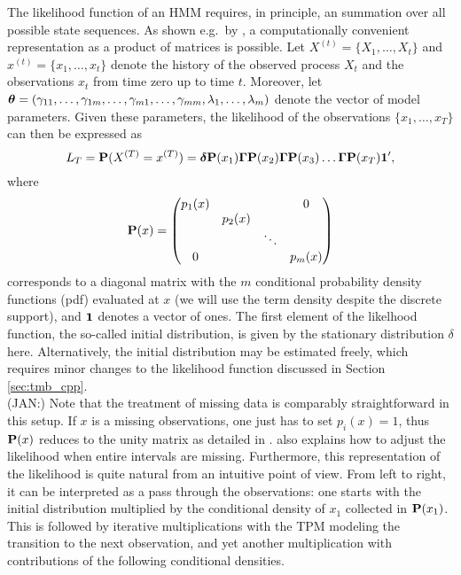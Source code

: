 \documentclass[bimj,fleqn]{w-art}\usepackage[]{graphicx}\usepackage[]{color}
\newcommand{\bcp}{{\bf P}}
\newcommand{\bgamma}{\mbox{\boldmath $\Gamma$}}
\newcommand{\btheta}{\mbox{\boldmath $\theta$}}
\newcommand{\bfdelta}{\mbox{\boldmath $\delta$}}
\newcommand{\bone}{{\bf 1}}
\theoremstyle{plain}
\theoremstyle{definition}
\begin{document}
The likelihood function of an HMM requires, in principle, an summation over all possible state sequences. As shown e.g.~by \citet[p.~37]{zucchini}, a computationally convenient representation as a product of matrices is possible. Let $X^{(t)} = \{X_1, \ldots, X_t \}$ and $x^{(t)} = \{x_1, \ldots, x_t \}$ denote the history of the observed process $X_t$ and the observations $x_t$ from time zero up to time $t$. Moreover, let $\btheta = (\gamma_{11}, \ldots, \gamma_{1m}, \ldots, \gamma_{m1}, \ldots, \gamma_{mm}, \lambda_1,\ldots, \lambda_m)$ denote the vector of model parameters. Given these parameters, the likelihood of the observations $\{x_1, \ldots, x_T \}$ can then be expressed as
\begin{equation}
\label{eq:hmm_likelihood}
L_T = \bcp(X^{(T)} = x^{(T)}) = \bfdelta \bcp(x_1) \bgamma \bcp(x_2) \bgamma \bcp(x_3) \ldots \bgamma \bcp(x_T) \bone',
\end{equation}
where
\begin{equation*}
\bcp(x) = \begin{pmatrix}
p_1(x)    &         &         & 0\\
          & p_2(x)  &         &\\
          &         & \ddots  &\\
0         &         &         & p_m(x)
\end{pmatrix}
\end{equation*}
corresponds to a diagonal matrix with the $m$ conditional probability density functions (pdf) evaluated at $x$ (we will use the term density despite the discrete support), and $\bone$ denotes a vector of ones. The first element of the likelhood function, the so-called initial distribution, is given by the stationary distribution $\delta$ here. Alternatively, the initial distribution may be estimated freely, which requires minor changes to the likelihood function discussed in Section \ref{sec:tmb_cpp}.\\
(JAN:) Note that the treatment of missing data is comparably straightforward in this setup. If $x$ is a missing observations, one just has to set $p_i(x) =  1$, thus $\bcp(x)$ reduces to the unity matrix as detailed in \citet[p. ~40]{zucchini}.
\citet[p. ~41]{zucchini} also explains how to adjust the likelihood when entire intervals are missing. Furthermore, this representation of the likelihood is quite natural from an intuitive point of view. From left to right, it can be interpreted as a pass through the observations: one starts with the initial distribution multiplied by the conditional density of $x_1$ collected in $\bcp(x_1)$. This is followed by iterative multiplications with the TPM modeling the transition to the next observation, and yet another multiplication with contributions of the following conditional densities.
\end{document}
